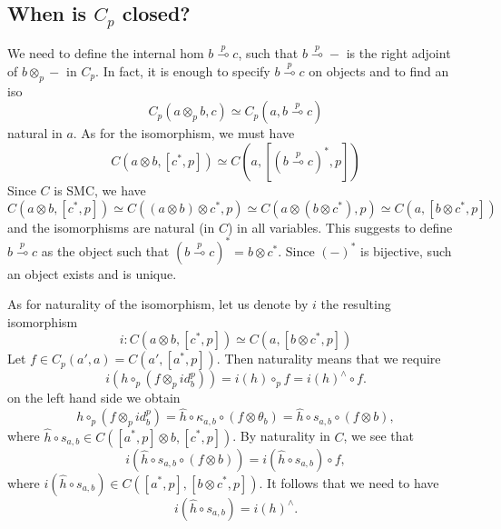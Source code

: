 \documentclass[12pt]{article}
\theoremstyle{definition}
\theoremstyle{remark}
\begin{document}
\subsection{When is $C_p$ closed?} 

We need to define the internal hom $b\overset{p}{\multimap} c$, such that
$b\overset{p}\multimap -$ is the right adjoint of $b\otimes_p -$ in $C_p$. In fact, it is
enough to specify $b\overset{p}\multimap c$ on objects and to find an iso
\[
C_p(a\otimes_p b,c)\simeq C_p(a,b\overset{p}\multimap c)
\]
natural in $a$. As for the isomorphism, we must have
\[
C(a\otimes b,[c^*,p])\simeq C(a, [(b\overset{p}\multimap c)^*,p])
\]
Since $C$ is SMC, we have
\[
C(a\otimes b, [c^*,p])\simeq C((a\otimes b)\otimes c^*,p)\simeq C(a\otimes (b\otimes
c^*),p)\simeq C(a, [b\otimes c^*,p]) 
\]
and the isomorphisms are natural (in $C$) in all variables. This suggests to define $b
\overset{p}\multimap c$ as the object such that $(b\overset{p}\multimap c)^*=b\otimes
c^*$. Since $(-)^*$ is bijective, such an object exists and is unique. 

As for naturality of the isomorphism, let us denote by $i$ the resulting isomorphism
\[
i: C(a\otimes b, [c^*,p])\simeq C(a, [b\otimes c^*,p])
\]
Let $f\in C_p(a',a)=C(a',[a^*,p])$. Then naturality means that we require
\[
i(h\circ_p(f\otimes_p id^p_b))=i(h)\circ_p f=i(h)^\wedge \circ f.
\]
on the left hand side  we obtain 
\[
h\circ_p(f\otimes_p id^p_b)=\hat h\circ \kappa_{a,b}\circ (f\otimes \theta_b)=\hat
h\circ s_{a,b}\circ (f\otimes b),
\]
where $\hat h\circ s_{a,b}\in C([a^*,p]\otimes b, [c^*,p])$. By naturality in $C$, we see
that 
\[
i(\hat h\circ s_{a,b}\circ (f\otimes b))=i(\hat h \circ s_{a,b})\circ f,
\]
where $i(\hat h\circ s_{a,b})\in C([a^*,p],[b\otimes c^*,p])$.
It follows that we need to have
\begin{equation}\label{eq:cpclosed}
i(\hat h\circ s_{a,b})=i(h)^\wedge.
\end{equation}






 
\end{document}
